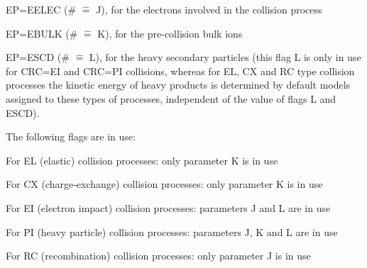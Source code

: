 EP=EELEC (\# $ \hat{=} $ J), for the electrons involved in the collision
process 

EP=EBULK (\# $ \hat{=} $ K), for the pre-collision bulk ions

EP=ESCD  (\# $ \hat{=} $ L), for the heavy secondary particles (this flag L  is
only in use for CRC=EI and CRC=PI collisions, whereas for EL, CX and RC type
collision processes the kinetic energy of heavy products is determined by
default models assigned to these types of processes, independent of the value
of flags L and ESCD).

The following flags are in use:

For EL (elastic) collision processes:  only parameter K is in use

For CX (charge-exchange) collision processes:	 only parameter K is in use

For EI (electron impact) collision processes:	 parameters J and L are in use

For PI (heavy particle) collision  processes:	 parameters J, K and L are in
use 

For RC (recombination)	collision processes:	 only parameter J is in use

